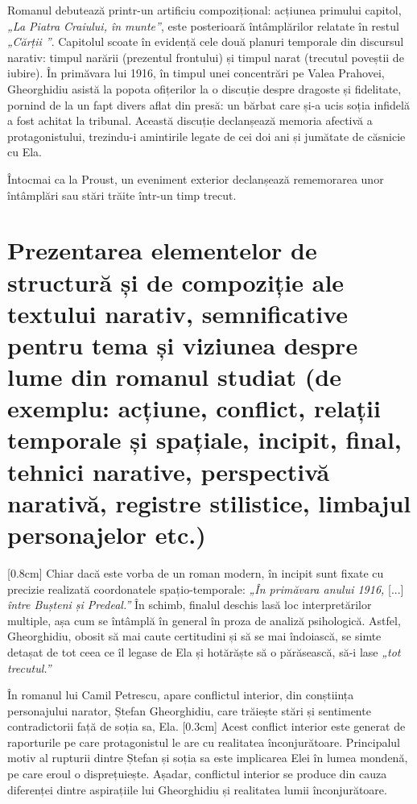 \documentclass[
12pt,                        %
a4paper                      %
]{article}
\newcommand{\rom}[1]{\uppercase\expandafter{\romannumeral #1\relax}} %
\begin{document}
Romanul debutează printr-un artificiu compozițional: acțiunea primului capitol, \textit{„La Piatra Craiului, în munte”}, este posterioară întâmplărilor relatate în restul \textit{„Cărții \rom{1}”}. Capitolul scoate în evidență cele două planuri temporale din discursul narativ: timpul narării (prezentul frontului) și timpul narat (trecutul poveștii de iubire). În primăvara lui 1916, în timpul unei concentrări pe Valea Prahovei, Gheorghidiu asistă la popota ofițerilor la o discuție despre dragoste și fidelitate, pornind de la un fapt divers aflat din presă: un bărbat care și-a ucis soția infidelă a fost achitat la tribunal. Această discuție declanșează memoria afectivă a protagonistului, trezindu-i amintirile legate de cei doi ani și jumătate de căsnicie cu Ela.

Întocmai ca la Proust, un eveniment exterior declanșează rememorarea unor întâmplări sau stări trăite într-un timp trecut.

\section{Prezentarea elementelor de structură și de compoziție ale textului narativ, semnificative pentru tema și viziunea despre lume din romanul studiat {\footnotesize (de exemplu: acțiune, conflict, relații temporale și spațiale, incipit, final, tehnici narative, perspectivă narativă, registre stilistice, limbajul personajelor etc.)}}

[0.8cm]
Chiar dacă este vorba de un roman modern, în incipit sunt fixate cu precizie realizată coordonatele spațio-temporale: \textit{„În primăvara anului 1916,} [...] \textit{între Bușteni și Predeal.”} În schimb, finalul deschis lasă loc interpretărilor multiple, așa cum se întâmplă în general în proza de analiză psihologică. Astfel, Gheorghidiu, obosit să mai caute certitudini și să se mai îndoiască, se simte detașat de tot ceea ce îl legase de Ela și hotărăște să o părăsească, să-i lase \textit{„tot trecutul.”}

În romanul lui Camil Petrescu, apare conflictul interior, din conștiința personajului narator, Ștefan Gheorghidiu, care trăiește stări și sentimente contradictorii față de soția sa, Ela.
[0.3cm]
Acest conflict interior este generat de raporturile pe care protagonistul le are cu realitatea înconjurătoare. Principalul motiv al rupturii dintre Ștefan și soția sa este implicarea Elei în lumea mondenă, pe care eroul o disprețuiește. Așadar, conflictul interior se produce din cauza diferenței dintre aspirațiile lui Gheorghidiu și realitatea lumii înconjurătoare.
\end{document}
